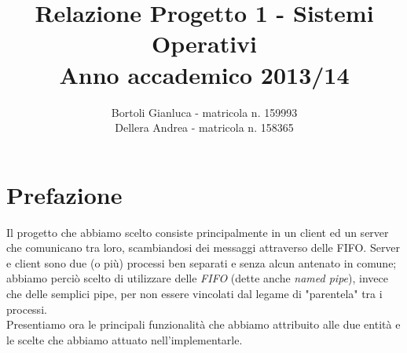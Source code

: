 \documentclass[a4paper,9pt]{article}
\begin{document}
\author{Bortoli Gianluca - matricola n. 159993\\Dellera Andrea - matricola n. 158365}
\title{Relazione Progetto 1 - Sistemi Operativi \\Anno accademico 2013/14}
\maketitle
\pagebreak

\section{Prefazione}
Il progetto che abbiamo scelto consiste principalmente in un client ed un server che comunicano tra loro, scambiandosi dei messaggi attraverso delle FIFO. Server e client sono due (o più) processi ben separati e senza alcun antenato in comune; abbiamo perciò scelto di utilizzare delle \emph{FIFO} (dette anche \emph{named pipe}), invece che delle semplici pipe, per non essere vincolati dal legame di "parentela" tra i processi.\\
Presentiamo ora le principali funzionalità che abbiamo attribuito alle due entità e le scelte che abbiamo attuato nell'implementarle.
\end{document}
